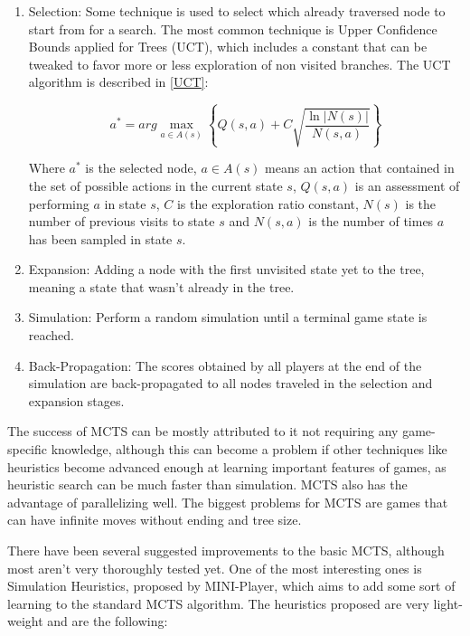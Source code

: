 \begin{enumerate}

\item Selection: Some technique is used to select which already traversed node to start from for a search. The most common technique is Upper Confidence Bounds applied for Trees (UCT), which includes a constant that can be tweaked to favor more or less exploration of non visited branches. The UCT algorithm is described in \ref{UCT}:

\begin{center}
\begin{equation} \label{UCT}
a^{*} = arg \max_{a\in A(s)} \left \{ Q(s,a) + C \sqrt{\frac{\ln|N(s)|} {N(s,a)}} \right \}
\end{equation}
\end{center}

Where $a^{*}$ is the selected node, $a \in A(s)$ means an action that contained in the set of possible actions in the current state $s$, $Q(s,a)$ is an assessment of performing $a$ in state $s$, $C$ is the exploration ratio constant, $N(s)$ is the number of previous visits to state $s$ and $N(s,a)$ is the number of times $a$ has been sampled in state $s$.

\item Expansion: Adding a node with the first unvisited state yet to the tree, meaning a state that wasn’t already in the tree.

\item Simulation: Perform a random simulation until a terminal game state is reached.

\item Back-Propagation: The scores obtained by all players at the end of the simulation are back-propagated to all nodes traveled in the selection and expansion stages.

\end{enumerate}

The success of MCTS can be mostly attributed to it not requiring any game-specific knowledge, although this can become a problem if other techniques like heuristics become advanced enough at learning important features of games, as heuristic search can be much faster than simulation. MCTS also has the advantage of parallelizing well. The biggest problems for MCTS are games that can have infinite moves without ending and tree size.

There have been several suggested improvements to the basic MCTS, although most aren’t very thoroughly tested yet. One of the most interesting ones is Simulation Heuristics, proposed by MINI-Player, which aims to add some sort of learning to the standard MCTS algorithm. The heuristics proposed are very light-weight and are the following:


